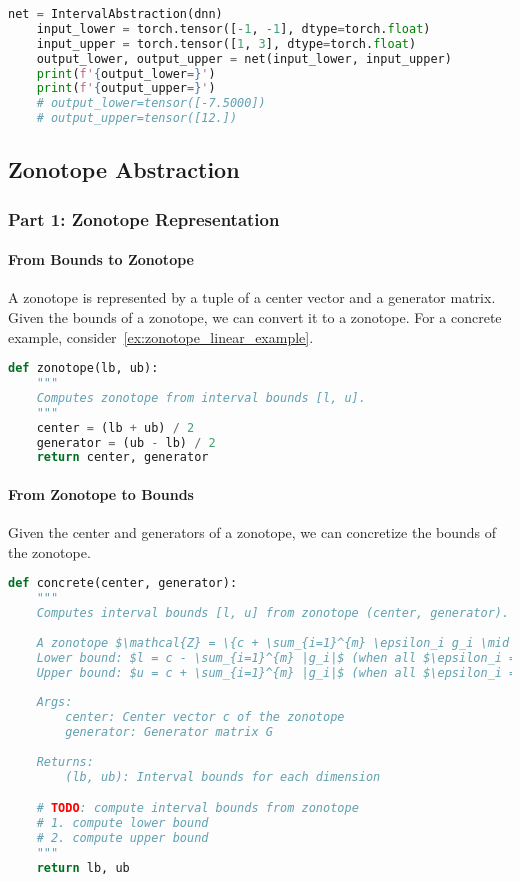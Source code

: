 \begin{lstlisting}[language=Python]
    net = IntervalAbstraction(dnn)
    input_lower = torch.tensor([-1, -1], dtype=torch.float)
    input_upper = torch.tensor([1, 3], dtype=torch.float)
    output_lower, output_upper = net(input_lower, input_upper)
    print(f'{output_lower=}')
    print(f'{output_upper=}')
    # output_lower=tensor([-7.5000])
    # output_upper=tensor([12.])
\end{lstlisting}


\subsection{Zonotope Abstraction}

\subsubsection{Part 1: Zonotope Representation}

\paragraph{From Bounds to Zonotope}

A zonotope is represented by a tuple of a center vector and a generator matrix. 
Given the bounds of a zonotope, we can convert it to a zonotope.
For a concrete example, consider~\autoref{ex:zonotope_linear_example}.
\begin{lstlisting}[language=Python]
def zonotope(lb, ub):
    """
    Computes zonotope from interval bounds [l, u].
    """
    center = (lb + ub) / 2
    generator = (ub - lb) / 2
    return center, generator
\end{lstlisting}

\paragraph{From Zonotope to Bounds}

Given the center and generators of a zonotope, we can concretize the bounds of the zonotope.
\begin{lstlisting}[language=Python]
def concrete(center, generator):
    """
    Computes interval bounds [l, u] from zonotope (center, generator).
    
    A zonotope $\mathcal{Z} = \{c + \sum_{i=1}^{m} \epsilon_i g_i \mid \epsilon_i \in [-1,1]\}$ can be converted to interval bounds:
    Lower bound: $l = c - \sum_{i=1}^{m} |g_i|$ (when all $\epsilon_i = -\text{sign}(g_i)$)
    Upper bound: $u = c + \sum_{i=1}^{m} |g_i|$ (when all $\epsilon_i = +\text{sign}(g_i)$)
    
    Args:
        center: Center vector c of the zonotope
        generator: Generator matrix G 
        
    Returns:
        (lb, ub): Interval bounds for each dimension

    # TODO: compute interval bounds from zonotope
    # 1. compute lower bound
    # 2. compute upper bound
    """
    return lb, ub
    
\end{lstlisting}

